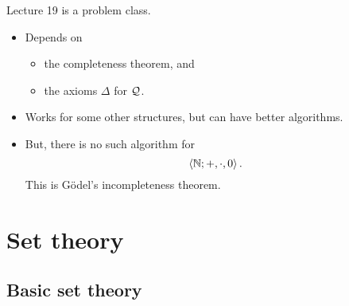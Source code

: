 
Lecture 19 is a problem class.


\begin{note*}
\hfill
\begin{itemize}
\item Depends on
\begin{itemize}
\item the completeness theorem, and
\item the axioms $ \Delta $ for $ \mathcal{Q} $.
\end{itemize}
\item Works for some other structures, but can have better algorithms.
\item But, there is no such algorithm for
$$ \left\langle \mathbb{N}; +, \cdot, 0 \right\rangle. $$
This is G\"odel's incompleteness theorem.
\end{itemize}
\end{note*}

\pagebreak

\section{Set theory}

\setcounter{subsection}{-1}

\subsection{Basic set theory}


